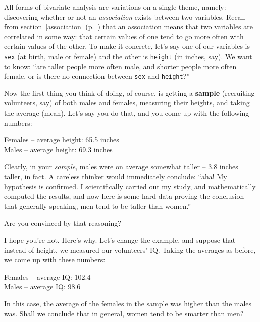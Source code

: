 All forms of bivariate analysis are variations on a single theme, namely:
discovering whether or not an \textit{association} exists between two
variables. Recall from section~\ref{association} (p.~\pageref{association})
that an association means that two variables are correlated in some way: that
certain values of one tend to go more often with certain values of the other.
To make it concrete, let's say one of our variables is \texttt{sex} (at birth,
male or female) and the other is \texttt{height} (in inches, say). We want to
know: ``are taller people more often male, and shorter people more often
female, or is there no connection between \texttt{sex} and \texttt{height}?''


Now the first thing you think of doing, of course, is getting a \textbf{sample}
(recruiting volunteers, say) of both males and females, measuring their
heights, and taking the average (mean). Let's say you do that, and you come up
with the following numbers:

\begin{center}
Females -- average height: 65.5 inches\\
Males -- average height: 69.3 inches
\end{center}

Clearly, in your \textit{sample}, males were on average somewhat taller -- 3.8
inches taller, in fact. A careless thinker would immediately conclude: ``aha!
My hypothesis is confirmed. I scientifically carried out my study, and
mathematically computed the results, and now here is some hard data proving the
conclusion that generally speaking, men tend to be taller than women.''

Are you convinced by that reasoning?


I hope you're not. Here's why. Let's change the example, and suppose that
instead of height, we measured our volunteers' IQ. Taking the averages as
before, we come up with these numbers:

\begin{center}
Females -- average IQ: 102.4\\
Males -- average IQ: 98.6
\end{center}

In this case, the average of the females in the sample was higher than the
males was. Shall we conclude that in general, women tend to be smarter than
men?

